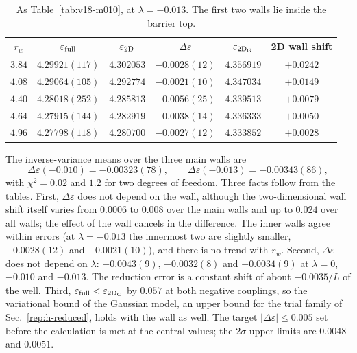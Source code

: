 \begin{table}[t]
\centering
\caption{As Table~\ref{tab:v18-m010}, at $\lambda=-0.013$. The first two walls lie inside the barrier top.}
\label{tab:v18-m013}
\begin{tabular}{cccccc}
\toprule
$r_w$ & $\varepsilon_{\rm full}$ & $\varepsilon_{\rm 2D}$ & $\Delta\varepsilon$ & $\varepsilon_{\rm 2D_G}$ & 2D wall shift \\
\midrule
$3.84$ & $4.29921(117)$ & $4.302053$ & $-0.0028(12)$ & $4.356919$ & $+0.0242$ \\ %
$4.08$ & $4.29064(105)$ & $4.292774$ & $-0.0021(10)$ & $4.347034$ & $+0.0149$ \\ %
$4.40$ & $4.28018(252)$ & $4.285813$ & $-0.0056(25)$ & $4.339513$ & $+0.0079$ \\ %
$4.64$ & $4.27915(144)$ & $4.282919$ & $-0.0038(14)$ & $4.336333$ & $+0.0050$ \\ %
$4.96$ & $4.27798(118)$ & $4.280700$ & $-0.0027(12)$ & $4.333852$ & $+0.0028$ \\ %
\bottomrule
\end{tabular}
\end{table}

The inverse-variance means over the three main walls are
\begin{equation}
\Delta\varepsilon(-0.010)=-0.00323(78),\qquad \Delta\varepsilon(-0.013)=-0.00343(86),
\label{eq:v18-dE}
\end{equation}
with $\chi^2=0.02$ and $1.2$ for two degrees of freedom. %
Three facts follow from the tables.
First, $\Delta\varepsilon$ does not depend on the wall, although the two-dimensional wall shift itself varies from $0.0006$ to $0.008$ over the main walls and up to $0.024$ over all walls; the effect of the wall cancels in the difference.
The inner walls agree within errors (at $\lambda=-0.013$ the innermost two are slightly smaller, $-0.0028(12)$ and $-0.0021(10)$), and there is no trend with $r_w$.
Second, $\Delta\varepsilon$ does not depend on $\lambda$: $-0.0043(9)$, $-0.0032(8)$ and $-0.0034(9)$ at $\lambda=0$, $-0.010$ and $-0.013$.
The reduction error is a constant shift of about $-0.0035/L$ of the well.
Third, $\varepsilon_{\rm full}<\varepsilon_{\rm 2D_G}$ by $0.057$ at both negative couplings, so the variational bound of the Gaussian model, an upper bound for the trial family of Sec.~\ref{rep:h-reduced}, holds with the wall as well. %
The target $|\Delta\varepsilon|\le0.005$ set before the calculation is met at the central values; the $2\sigma$ upper limits are $0.0048$ and $0.0051$. %

